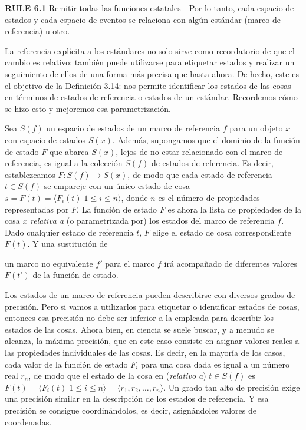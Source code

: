 \begin{justifying}
  \textbf{RULE 6.1} Remitir todas las funciones estatales - Por lo tanto, cada espacio de estados y cada espacio de eventos se relaciona con algún estándar (marco de referencia) u otro.

  La referencia explícita a los estándares no solo sirve como recordatorio de que el cambio es relativo: también puede utilizarse para etiquetar estados y realizar un seguimiento de ellos de una forma más precisa que hasta ahora. De hecho, este es el objetivo de la Definición 3.14: nos permite identificar los estados de las cosas en términos de estados de referencia o estados de un estándar. Recordemos cómo se hizo esto y mejoremos esa parametrización.

  Sea $S(f)$ un espacio de estados de un marco de referencia $f$ para un objeto $x$ con espacio de estados $S(x)$. Además, supongamos que el dominio de la función de estado $F$ que abarca $S(x)$, lejos de no estar relacionado con el marco de referencia, es igual a la colección $S(f)$ de estados de referencia. Es decir, establezcamos $F: S(f) \to S(x)$, de modo que cada estado de referencia $t \in S(f)$ se empareje con un único estado de cosa $s=F(t) = \langle F_i(t)| 1 \le i \le n \rangle$, donde $n$ es el número de propiedades representadas por $F$. La función de estado $F$ es ahora la lista de propiedades de la cosa $x$ \textit{relativa a} (o parametrizada por) los estados del marco de referencia $f$. Dado cualquier estado de referencia $t$, $F$ elige el estado de cosa correspondiente $F(t)$. Y una sustitución de

  un marco no equivalente $f'$ para el marco $f$ irá acompañado de diferentes valores $F(t')$ de la función de estado.

  Los estados de un marco de referencia pueden describirse con diversos grados de precisión. Pero si vamos a utilizarlos para etiquetar o identificar estados de cosas, entonces esa precisión no debe ser inferior a la empleada para describir los estados de las cosas. Ahora bien, en ciencia se suele buscar, y a menudo se alcanza, la máxima precisión, que en este caso consiste en asignar valores reales a las propiedades individuales de las cosas. Es decir, en la mayoría de los casos, cada valor de la función de estado $F_i$ para una cosa dada es igual a un número real $r_n$, de modo que el estado de la cosa en (\textit{relativo a}) $t \in S(f)$ es $F(t) = \langle F_i(t)| 1 \le i \le n \rangle = \langle r_1, r_2, \dots, r_n \rangle$. Un grado tan alto de precisión exige una precisión similar en la descripción de los estados de referencia. Y esa precisión se consigue coordinándolos, es decir, asignándoles valores de coordenadas.


\end{justifying}
